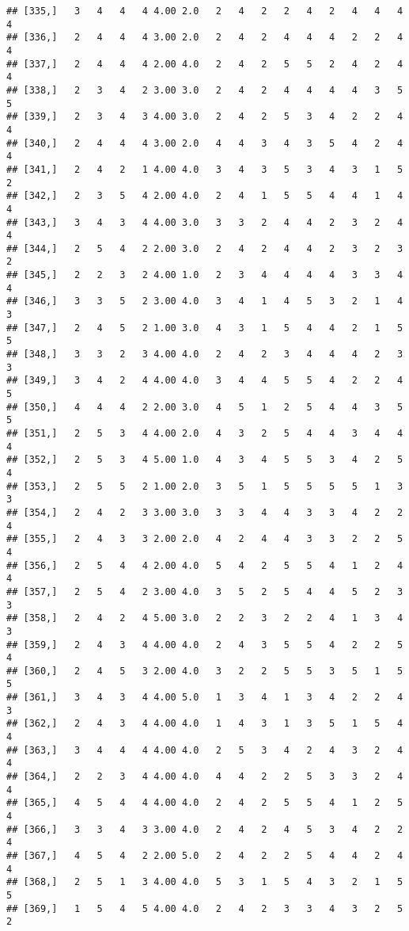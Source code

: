 \documentclass[]{article}
\begin{document}
\begin{verbatim}
## [335,]   3   4   4   4 4.00 2.0   2   4   2   2   4   2   4   4   4   4
## [336,]   2   4   4   4 3.00 2.0   2   4   2   4   4   4   2   2   4   4
## [337,]   2   4   4   4 2.00 4.0   2   4   2   5   5   2   4   2   4   4
## [338,]   2   3   4   2 3.00 3.0   2   4   2   4   4   4   4   3   5   5
## [339,]   2   3   4   3 4.00 3.0   2   4   2   5   3   4   2   2   4   4
## [340,]   2   4   4   4 3.00 2.0   4   4   3   4   3   5   4   2   4   4
## [341,]   2   4   2   1 4.00 4.0   3   4   3   5   3   4   3   1   5   2
## [342,]   2   3   5   4 2.00 4.0   2   4   1   5   5   4   4   1   4   4
## [343,]   3   4   3   4 4.00 3.0   3   3   2   4   4   2   3   2   4   4
## [344,]   2   5   4   2 2.00 3.0   2   4   2   4   4   2   3   2   3   2
## [345,]   2   2   3   2 4.00 1.0   2   3   4   4   4   4   3   3   4   4
## [346,]   3   3   5   2 3.00 4.0   3   4   1   4   5   3   2   1   4   3
## [347,]   2   4   5   2 1.00 3.0   4   3   1   5   4   4   2   1   5   5
## [348,]   3   3   2   3 4.00 4.0   2   4   2   3   4   4   4   2   3   3
## [349,]   3   4   2   4 4.00 4.0   3   4   4   5   5   4   2   2   4   5
## [350,]   4   4   4   2 2.00 3.0   4   5   1   2   5   4   4   3   5   5
## [351,]   2   5   3   4 4.00 2.0   4   3   2   5   4   4   3   4   4   4
## [352,]   2   5   3   4 5.00 1.0   4   3   4   5   5   3   4   2   5   4
## [353,]   2   5   5   2 1.00 2.0   3   5   1   5   5   5   5   1   3   3
## [354,]   2   4   2   3 3.00 3.0   3   3   4   4   3   3   4   2   2   4
## [355,]   2   4   3   3 2.00 2.0   4   2   4   4   3   3   2   2   5   4
## [356,]   2   5   4   4 2.00 4.0   5   4   2   5   5   4   1   2   4   4
## [357,]   2   5   4   2 3.00 4.0   3   5   2   5   4   4   5   2   3   3
## [358,]   2   4   2   4 5.00 3.0   2   2   3   2   2   4   1   3   4   3
## [359,]   2   4   3   4 4.00 4.0   2   4   3   5   5   4   2   2   5   4
## [360,]   2   4   5   3 2.00 4.0   3   2   2   5   5   3   5   1   5   5
## [361,]   3   4   3   4 4.00 5.0   1   3   4   1   3   4   2   2   4   3
## [362,]   2   4   3   4 4.00 4.0   1   4   3   1   3   5   1   5   4   4
## [363,]   3   4   4   4 4.00 4.0   2   5   3   4   2   4   3   2   4   4
## [364,]   2   2   3   4 4.00 4.0   4   4   2   2   5   3   3   2   4   4
## [365,]   4   5   4   4 4.00 4.0   2   4   2   5   5   4   1   2   5   4
## [366,]   3   3   4   3 3.00 4.0   2   4   2   4   5   3   4   2   2   4
## [367,]   4   5   4   2 2.00 5.0   2   4   2   2   5   4   4   2   4   4
## [368,]   2   5   1   3 4.00 4.0   5   3   1   5   4   3   2   1   5   5
## [369,]   1   5   4   5 4.00 4.0   2   4   2   3   3   4   3   2   5   2

\end{verbatim}
\end{document}
